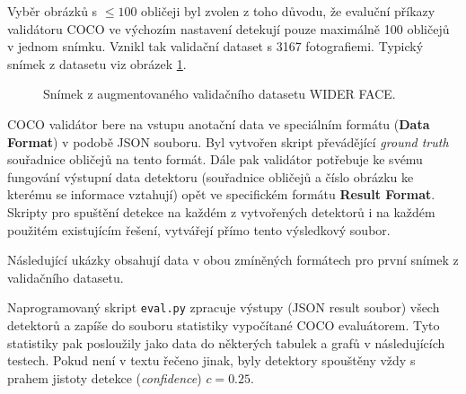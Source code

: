 Vyběr obrázků s  $\le 100$ obličeji byl zvolen z toho důvodu, že evaluční příkazy validátoru COCO ve výchozím nastavení detekují pouze maximálně 100 obličejů v jednom snímku. Vznikl tak validační dataset s 3167 fotografiemi. Typický snímek z datasetu viz obrázek \ref{obrazek:valdataset}.

\begin{figure}[H] 
  \begin{center}
  \label{obrazek:valdataset}
  \caption{Snímek z augmentovaného validačního datasetu WIDER FACE.}
  \end{center}
\end{figure}

COCO validátor bere na vstupu anotační data ve speciálním formátu (\textbf{Data Format}) v podobě JSON souboru. Byl vytvořen skript převádějící \emph{ground truth} souřadnice obličejů na tento formát. Dále pak validátor potřebuje ke svému fungování výstupní data detektoru (souřadnice obličejů a číslo obrázku ke kterému se informace vztahují) opět ve specifickém formátu \textbf{Result Format}. Skripty pro spuštění detekce na každém z vytvořených detektorů i na každém použitém existujícím řešení, vytvářejí přímo tento výsledkový soubor.

Následující ukázky obsahují data v obou zmíněných formátech pro první snímek z validačního datasetu.


Naprogramovaný skript \texttt{eval.py} zpracuje výstupy (JSON result soubor) všech detektorů a zapíše do souboru statistiky vypočítané COCO evaluátorem. Tyto statistiky pak posloužily jako data do některých tabulek a grafů v následujících testech. Pokud není v textu řečeno jinak, byly detektory spouštěny vždy s prahem jistoty detekce (\emph{confidence}) $c = 0.25$.


